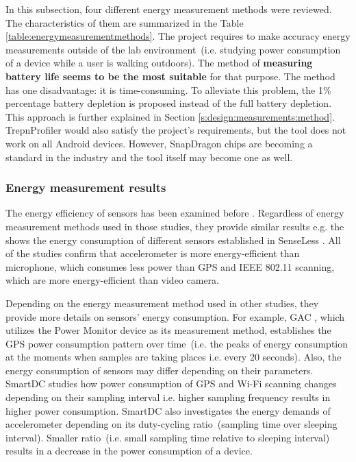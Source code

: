 In this subsection, four different energy measurement methods were reviewed. The characteristics of them are summarized in the Table \ref{table:energymeasurementmethods}. The project requires to make accuracy energy measurements outside of the lab environment\ (i.e. studying power consumption of a device while a user is walking outdoors). The method of \textbf{measuring battery life seems to be the most suitable} for that purpose. The method has one disadvantage: it is time-consuming. To alleviate this problem, the 1\% percentage battery depletion is proposed instead of the full battery depletion. This approach is further explained in Section \ref{s:design:measurements:method}. TrepnProfiler would also satisfy the project's requirements, but the tool does not work on all Android devices. However, SnapDragon chips are becoming a standard in the industry and the tool itself may become one as well. 

\subsubsection{Energy measurement results}
\hspace{10pt} The energy efficiency of sensors has been examined before \cite{benabdesslem:senseless} \cite{constandache:localization} \cite{wang:eemss} \cite{chon:smartdc}. Regardless of energy measurement methods used in those studies, they provide similar results e.g. the  shows the energy consumption of different sensors established in SenseLess \cite{benabdesslem:senseless}. All of the studies confirm that accelerometer is more energy-efficient than microphone, which consumes less power than GPS and IEEE 802.11 scanning, which are more energy-efficient than video camera.


Depending on the energy measurement method used in other studies, they provide more details on sensors' energy consumption. For example, GAC \cite{youssef:gac}, which utilizes the Power Monitor device as its measurement method, establishes the GPS power consumption pattern over time\ (i.e. the peaks of energy consumption at the moments when samples are taking places i.e. every 20 seconds). Also, the energy consumption of sensors may differ depending on their parameters. SmartDC \cite{chon:smartdc} studies how power consumption of GPS and Wi-Fi scanning changes depending on their sampling interval i.e. higher sampling frequency results in higher power consumption. SmartDC also investigates the energy demands of accelerometer depending on its duty-cycling ratio\ (sampling time over sleeping interval). Smaller ratio\ (i.e. small sampling time relative to sleeping interval) results in a decrease in the power consumption of a device.  

